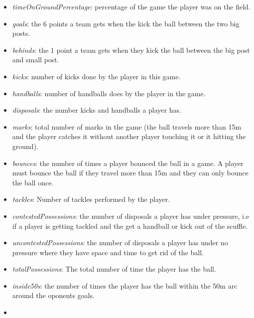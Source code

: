 \begin{itemize}
\tightlist
\item
  \emph{timeOnGroundPercentage}: percentage of the game the player was
  on the field.\\
\item
  \emph{goals}: the 6 points a team gets when the kick the ball between
  the two big posts.\\
\item
  \emph{behinds}: the 1 point a team gets when they kick the ball
  between the big post and small post.\\
\item
  \emph{kicks}: number of kicks done by the player in this game.\\
\item
  \emph{handballs}: number of handballs does by the player in the
  game.\\
\item
  \emph{disposals}: the number kicks and handballs a player has.\\
\item
  \emph{marks}: total number of marks in the game (the ball travels more
  than 15m and the player catches it without another player touching it
  or it hitting the ground).\\
\item
  \emph{bounces}: the number of times a player bounced the ball in a
  game. A player must bounce the ball if they travel more than 15m and
  they can only bounce the ball once.\\
\item
  \emph{tackles}: Number of tackles performed by the player.\\
\item
  \emph{contestedPossessions}: the number of disposals a player has
  under pressure, i.e if a player is getting tackled and the get a
  handball or kick out of the scuffle.\\
\item
  \emph{uncontestedPossessions}: the number of disposals a player has
  under no pressure where they have space and time to get rid of the
  ball.\\
\item
  \emph{totalPossessions}: The total number of time the player has the
  ball.
\item
  \emph{inside50s}: the number of times the player has the ball within
  the 50m arc around the oponents goals.\\
\item

\end{itemize}
